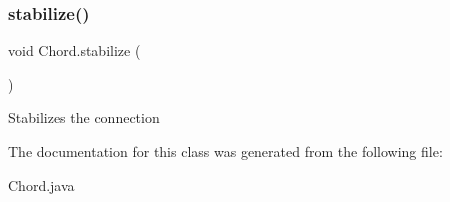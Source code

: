 \mbox{\label{class_chord_a8a4b7a1cd88cb3f607ada0629f2ff2dd}} 
\subsubsection{\texorpdfstring{stabilize()}{stabilize()}}
{\footnotesize\ttfamily void Chord.\+stabilize (\begin{DoxyParamCaption}{ }\end{DoxyParamCaption})\hspace{0.3cm}{\ttfamily [inline]}}

Stabilizes the connection 

The documentation for this class was generated from the following file\+:\begin{DoxyCompactItemize}
\item 
Chord.\+java\end{DoxyCompactItemize}
